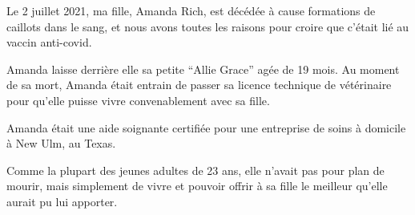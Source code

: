Le 2 juillet 2021, ma fille, Amanda Rich, est décédée à cause formations de
caillots dans le sang, et nous avons toutes les raisons pour croire que c'était
lié au vaccin anti-covid.

Amanda laisse derrière elle sa petite “Allie Grace” agée de 19 mois. Au moment
de sa mort, Amanda était entrain de passer sa licence technique de vétérinaire
pour qu'elle puisse vivre convenablement avec sa fille.

Amanda était une aide soignante certifiée pour une entreprise de soins à
domicile à New Ulm, au Texas.

Comme la plupart des jeunes adultes de 23 ans, elle n'avait pas pour plan de
mourir, mais simplement de vivre et pouvoir offrir à sa fille le meilleur
qu'elle aurait pu lui apporter.

